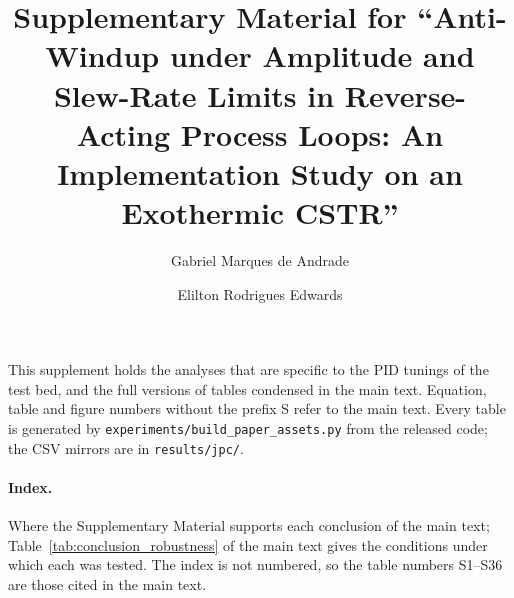 \documentclass[11pt]{article}
\title{Supplementary Material for ``Anti-Windup under Amplitude and Slew-Rate Limits in Reverse-Acting Process Loops: An Implementation Study on an Exothermic CSTR''}
\author{Gabriel Marques de Andrade \and Elilton Rodrigues Edwards}
\date{}
\begin{document}
\maketitle
\sloppy  %
This supplement holds the analyses that are specific to the PID tunings of the test bed, and the full versions of tables condensed in the main text. Equation, table and figure numbers without the prefix S refer to the main text. Every table is generated by \texttt{experiments/build\_paper\_assets.py} from the released code; the CSV mirrors are in \texttt{results/jpc/}.

\paragraph{Index.} Where the Supplementary Material supports each conclusion of the main text; Table~\ref{tab:conclusion_robustness} of the main text gives the conditions under which each was tested. The index is not numbered, so the table numbers S1--S36 are those cited in the main text.
\end{document}
